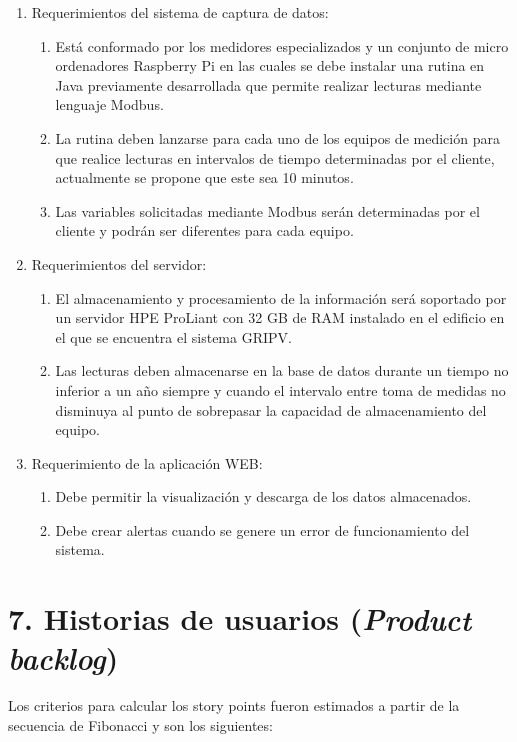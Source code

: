 \documentclass[
11pt, %
codirector, %
]{charter}
\begin{document}
\begin{enumerate}
	\item Requerimientos del sistema de captura de datos:
		\begin{enumerate}
			\item Está conformado por los medidores especializados y un conjunto de micro ordenadores Raspberry Pi en las cuales se debe instalar una rutina en Java previamente desarrollada que permite realizar lecturas mediante lenguaje Modbus.
			\item La rutina deben lanzarse para cada uno de los equipos de medición para que realice lecturas en intervalos de tiempo determinadas por el cliente, actualmente se propone que este sea 10 minutos.
			\item Las variables solicitadas mediante Modbus serán determinadas por el cliente y podrán ser diferentes para cada equipo.
		\end{enumerate}
	\item Requerimientos del servidor:
		\begin{enumerate}
			\item El almacenamiento y procesamiento de la información será soportado por un servidor HPE ProLiant con 32 GB de RAM instalado en el edificio en el que se encuentra el sistema GRIPV.
			\item Las lecturas deben almacenarse en la base de datos durante un tiempo no inferior a un año siempre y cuando el intervalo entre toma de medidas no disminuya al punto de sobrepasar la capacidad de almacenamiento del equipo. 
			\end{enumerate}
	\item Requerimiento de la aplicación WEB:
	\begin{enumerate}
			\item Debe permitir la visualización y descarga de los datos almacenados.
			\item Debe crear alertas cuando se genere un error de funcionamiento del sistema.			
			\end{enumerate}

\end{enumerate}



\section{7. Historias de usuarios (\textit{Product backlog})}
\label{sec:backlog}


Los criterios para calcular los story points fueron estimados a partir de la secuencia de Fibonacci y son los siguientes:
\end{document}
